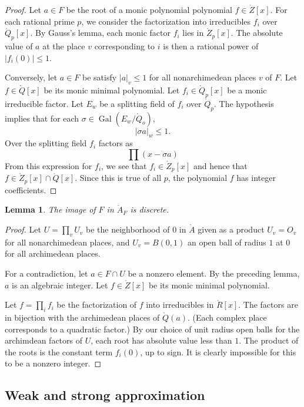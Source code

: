 \documentclass{amsart}
\newtheorem{lemma}[equation]{Lemma}
\def\abs#1{{|#1|}}
\def\op#1{{\operatorname{#1}}}
\def\ZZ{\ring{Z}}
\def\QQ{\ring{Q}}
\def\AA{\ring{A}}
\def\oG{\op{Gal}}
\begin{document}
\begin{proof} Let $a\in F$ be the root of a monic polynomial
  polynomial $f\in \ZZ[x]$.  For each rational prime $p$, we consider
  the factorization into irreducibles $f_i$ over $\QQ_p[x]$.  By
  Gauss's lemma, each monic factor $f_i$ lies in $\ZZ_p[x]$.  The
  absolute value of $a$ at the place $v$ corresponding to $i$ is then
  a rational power of $|f_i(0)|\le 1$.

Conversely, let $a\in F$ be satisfy $|a|_v\le 1$ for all
nonarchimedean places $v$ of $F$.  Let $f\in \QQ[x]$ be its monic
minimal polynomial.  Let $f_i\in \QQ_p[x]$ be a monic irreducible
factor.  Let $E_w$ be a splitting field of $f_i$ over $\QQ_p$.  The
hypothesis implies that for each $\sigma\in \oG(E_w/\QQ_o)$,
\[
\abs{\sigma a}_w\le 1.
\]
Over the splitting field $f_i$ factors as 
\[
\prod (x - \sigma a)
\]
From this expression for $f_i$, we see that $f_i\in \ZZ_p[x]$ and
hence that $f\in \ZZ_p[x]\cap \QQ[x]$.  Since this is true of all $p$,
the polynomial $f$ has integer coefficients.
\end{proof}

\begin{lemma} The image of $F$ in $\AA_F$ is discrete.
\end{lemma}

\begin{proof} Let $U=\prod_v U_v$ be the neighborhood of $0$ in $\AA$
  given as a product $U_v = O_v$ for all nonarchimedean places, and
  $U_v = B(0,1)$ an open ball of radius $1$ at $0$ for all archimedean
  places.  

  For a contradiction, let $a \in F\cap U$ be a nonzero element.  
  By the preceding lemma, $a$ is an
  algebraic integer.  Let $f\in \ring{Z}[x]$ be its monic minimal polynomial.

  Let $f = \prod_i f_i$ be the factorization of $f$ into irreducibles
  in $\ring{R}[x]$.  The factors are in bijection with the archimedean
  places of $\QQ(a)$.  (Each complex place corresponds to a quadratic
  factor.)  By our choice of unit radius open balls for the archimdean
  factors of $U$, each root has absolute value less
  than $1$.  The product of the roots is the constant term $f_i(0)$,
  up to sign.  It is clearly impossible for this to be a nonzero integer.
\end{proof}

 \subsection{Weak and strong approximation}
\end{document}
